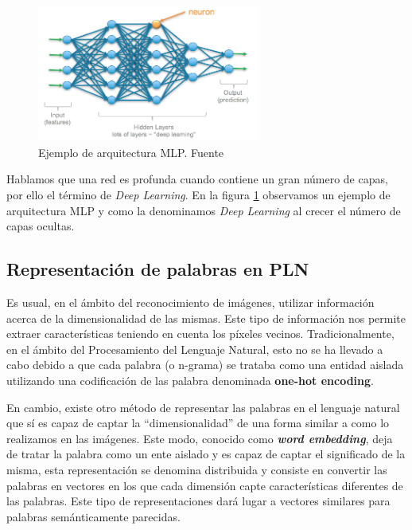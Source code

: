 \begin{figure}[!ht]
	\centering
	\includegraphics[width=0.65\textwidth]{images/arte/mlp}
	\caption{Ejemplo de arquitectura MLP. Fuente \cite{mlp}}
	\label{fig:mlp}
\end{figure}



Hablamos que una red es profunda cuando contiene un gran número de capas, por ello el término de \textit{Deep Learning}. En la figura \ref{fig:mlp} observamos un ejemplo de arquitectura MLP y como la denominamos \textit{Deep Learning} al crecer el número de capas ocultas.


\subsection{Representación de palabras en PLN}%

Es usual, en el ámbito del reconocimiento de imágenes, utilizar información acerca de la dimensionalidad de las mismas. Este tipo de información nos permite extraer características  teniendo en cuenta los píxeles vecinos. Tradicionalmente, en el ámbito del Procesamiento del Lenguaje Natural, esto no se ha llevado a cabo debido a que cada palabra (o n-grama) se trataba como una entidad aislada utilizando una codificación de las palabra denominada \textbf{one-hot encoding}. 

En cambio, existe otro método de representar las palabras en el lenguaje natural que sí es capaz de captar la ``dimensionalidad'' de una forma similar a como lo realizamos en las imágenes. Este modo, conocido como \textit{\textbf{word embedding}}, deja de tratar la palabra como un ente aislado y  es capaz de captar el significado de la misma, esta representación se denomina distribuida y consiste en convertir las palabras en vectores en los que cada dimensión capte características diferentes de las palabras. Este tipo de representaciones dará lugar a vectores similares para palabras semánticamente parecidas. 


